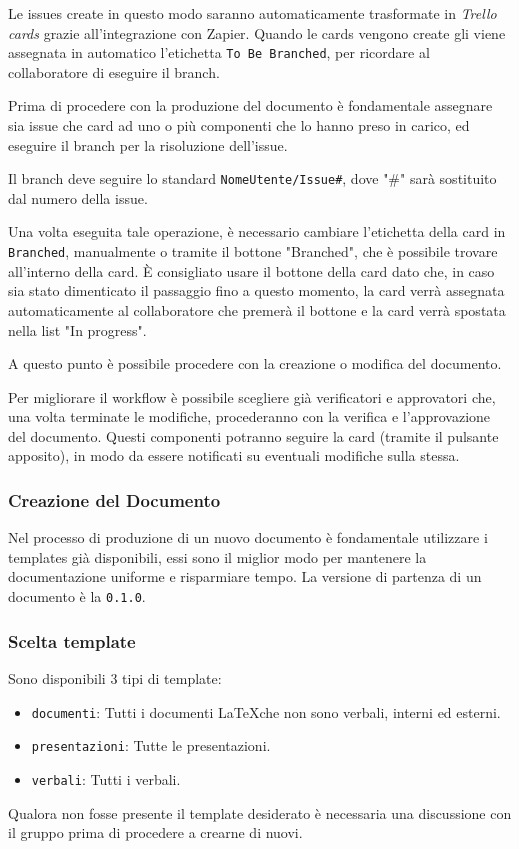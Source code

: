 Le issues create in questo modo saranno automaticamente trasformate in \textit{Trello cards} grazie all'integrazione con Zapier.
Quando le cards vengono create gli viene assegnata in automatico l'etichetta \texttt{To Be Branched}, per ricordare al collaboratore di eseguire il branch.

Prima di procedere con la produzione del documento è fondamentale assegnare sia issue che card ad uno o più componenti che lo hanno preso in carico, ed eseguire il branch per la risoluzione dell'issue.

Il branch deve seguire lo standard \texttt{NomeUtente/Issue\#}, dove "\#" sarà sostituito dal numero della issue.

Una volta eseguita tale operazione, è necessario cambiare l'etichetta della card in \texttt{Branched}, manualmente o tramite il bottone "Branched", che è possibile trovare all'interno della card.
È consigliato usare il bottone della card dato che, in caso sia stato dimenticato il passaggio fino a questo momento, la card verrà assegnata automaticamente al collaboratore che premerà il bottone e la card verrà spostata nella list "In progress".

A questo punto è possibile procedere con la creazione o modifica del documento.

Per migliorare il workflow è possibile scegliere già verificatori e approvatori che, una volta terminate le modifiche, procederanno con la verifica e l'approvazione del documento. Questi componenti potranno seguire la card (tramite il pulsante apposito), in modo da essere notificati su eventuali modifiche sulla stessa.

\subsubsection{Creazione del Documento}
Nel processo di produzione di un nuovo documento è fondamentale utilizzare i templates già
disponibili, essi sono il miglior modo per mantenere la documentazione uniforme e
risparmiare tempo.
La versione di partenza di un documento è la \texttt{0.1.0}.

\subsubsection{Scelta template}

Sono disponibili 3 tipi di template:
\begin{itemize}
    \item \texttt{documenti}: Tutti i documenti \LaTeX che non sono verbali, interni ed esterni.
    \item \texttt{presentazioni}: Tutte le presentazioni.
    \item \texttt{verbali}: Tutti i verbali.
\end{itemize}
Qualora non fosse presente il template desiderato è necessaria una discussione con il gruppo prima di procedere a crearne di nuovi.

